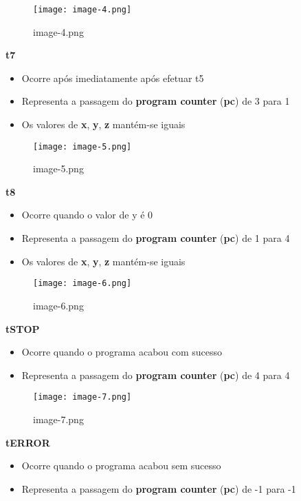 \documentclass[11pt]{article}
\providecommand{\tightlist}{%
      \setlength{\itemsep}{0pt}\setlength{\parskip}{0pt}}
\begin{document}
\begin{figure}
\centering
\texttt{[image: image-4.png]}
\caption{image-4.png}
\end{figure}
\pagebreak
\hypertarget{t7}{%
\textbf{\Large t7}\label{t7}}

\begin{itemize}
\tightlist
\item
  Ocorre após imediatamente após efetuar t5
\item
  Representa a passagem do \textbf{program counter} (\textbf{pc}) de 3
  para 1
\item
  Os valores de \textbf{x}, \textbf{y}, \textbf{z} mantém-se iguais
\end{itemize}

\begin{figure}
\centering
\texttt{[image: image-5.png]}
\caption{image-5.png}
\end{figure}

\hypertarget{t8}{%
\textbf{\Large t8}\label{t8}}

\begin{itemize}
\tightlist
\item
  Ocorre quando o valor de y é 0
\item
  Representa a passagem do \textbf{program counter} (\textbf{pc}) de 1
  para 4
\item
  Os valores de \textbf{x}, \textbf{y}, \textbf{z} mantém-se iguais
\end{itemize}

\begin{figure}
\centering
\texttt{[image: image-6.png]}
\caption{image-6.png}
\end{figure}

\hypertarget{tstop}{%
\textbf{\Large tSTOP}\label{tstop}}

\begin{itemize}
\tightlist
\item
  Ocorre quando o programa acabou com sucesso
\item
  Representa a passagem do \textbf{program counter} (\textbf{pc}) de 4
  para 4
\end{itemize}

\begin{figure}
\centering
\texttt{[image: image-7.png]}
\caption{image-7.png}
\end{figure}

\hypertarget{terror}{%
\textbf{\Large tERROR}\label{terror}}

\begin{itemize}
\tightlist
\item
  Ocorre quando o programa acabou sem sucesso
\item
  Representa a passagem do \textbf{program counter} (\textbf{pc}) de -1
  para -1
\end{itemize}
\end{document}
